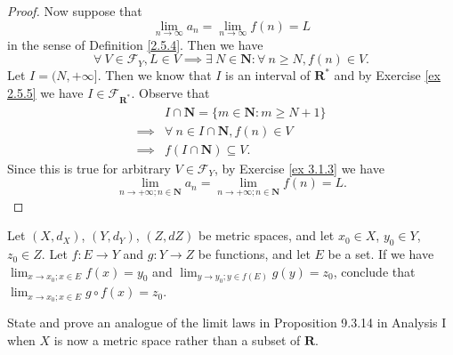 \begin{proof}
    Now suppose that
    \[
        \lim_{n \to \infty} a_n = \lim_{n \to \infty} f(n) = L
    \]
    in the sense of Definition \ref{2.5.4}.
    Then we have
    \[
        \forall\ V \in \mathcal{F}_Y, L \in V \implies \exists\ N \in \mathbf{N} : \forall\ n \geq N, f(n) \in V.
    \]
    Let \(I = (N, +\infty]\).
    Then we know that \(I\) is an interval of \(\mathbf{R}^*\) and by Exercise \ref{ex 2.5.5} we have \(I \in \mathcal{F}_{\mathbf{R}^*}\).
    Observe that
    \begin{align*}
                 & I \cap \mathbf{N} = \{m \in \mathbf{N} : m \geq N + 1\} \\
        \implies & \forall\ n \in I \cap \mathbf{N}, f(n) \in V            \\
        \implies & f(I \cap \mathbf{N}) \subseteq V.
    \end{align*}
    Since this is true for arbitrary \(V \in \mathcal{F}_Y\), by Exercise \ref{ex 3.1.3} we have
    \[
        \lim_{n \to +\infty ; n \in \mathbf{N}} a_n = \lim_{n \to +\infty ; n \in \mathbf{N}} f(n) = L.
    \]
\end{proof}

\begin{exercise}\label{ex 3.1.5}
    Let \((X, d_X)\), \((Y, d_Y)\), \((Z, d Z)\) be metric spaces, and let \(x_0 \in X\), \(y_0 \in Y\), \(z_0 \in Z\).
    Let \(f : E \to Y\) and \(g : Y \to Z\) be functions, and let \(E\) be a set.
    If we have \(\lim_{x \to x_0 ; x \in E} f(x) = y_0\) and \(\lim_{y \to y_0 ; y \in f(E)} g(y) = z_0\), conclude that \(\lim_{x \to x_0 ; x \in E} g \circ f(x) = z_0\).
\end{exercise}

\begin{exercise}\label{ex 3.1.6}
    State and prove an analogue of the limit laws in Proposition 9.3.14 in Analysis I when \(X\) is now a metric space rather than a subset of \(\mathbf{R}\).
\end{exercise}